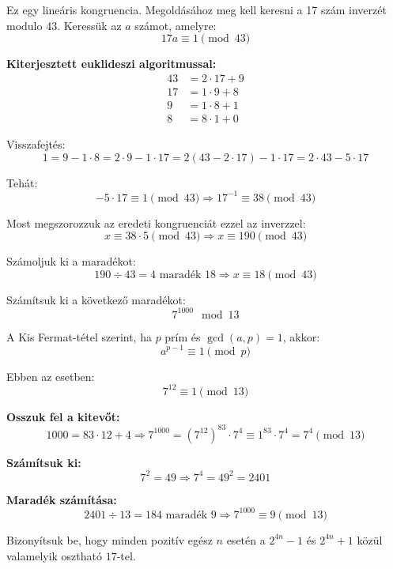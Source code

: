\begin{solution}
	Ez egy lineáris kongruencia. Megoldásához meg kell keresni a 17 szám
	inverzét modulo 43. Keressük az $a$ számot, amelyre: 
	\[
	17a\equiv1\pmod{43}
	\]
	
	\textbf{Kiterjesztett euklideszi algoritmussal:} 
	\begin{align*}
		43 & =2\cdot17+9\\
		17 & =1\cdot9+8\\
		9 & =1\cdot8+1\\
		8 & =8\cdot1+0
	\end{align*}
	
	Visszafejtés: 
	\[
	1=9-1\cdot8=2\cdot9-1\cdot17=2(43-2\cdot17)-1\cdot17=2\cdot43-5\cdot17
	\]
	
	Tehát: 
	\[
	-5\cdot17\equiv1\pmod{43}\Rightarrow17^{-1}\equiv38\pmod{43}
	\]
	
	Most megszorozzuk az eredeti kongruenciát ezzel az inverzzel: 
	\[
	x\equiv38\cdot5\pmod{43}\Rightarrow x\equiv190\pmod{43}
	\]
	
	Számoljuk ki a maradékot: 
	\[
	190\div43=4\text{ maradék }18\Rightarrow\boxed{x\equiv18\pmod{43}}
	\]
\end{solution}

\begin{extraproblem}
	Számítsuk ki a következő maradékot: 
	\[
	7^{1000}\mod 13
	\]
\end{extraproblem}

\begin{solution}
	A Kis Fermat-tétel szerint, ha $p$ prím és $\gcd(a,p)=1$, akkor:
	\[
	a^{p-1}\equiv1\pmod p
	\]
	
	Ebben az esetben: 
	\[
	7^{12}\equiv1\pmod{13}
	\]
	
	\textbf{Osszuk fel a kitevőt:} 
	\[
	1000=83\cdot12+4\Rightarrow7^{1000}=(7^{12})^{83}\cdot7^{4}\equiv1^{83}\cdot7^{4}=7^{4}\pmod{13}
	\]
	
	\textbf{Számítsuk ki:} 
	\[
	7^{2}=49\Rightarrow7^{4}=49^{2}=2401
	\]
	
	\textbf{Maradék számítása:} 
	\[
	2401\div13=184\text{ maradék }9\Rightarrow\boxed{7^{1000}\equiv9\pmod{13}}
	\]
\end{solution}
\begin{extraproblem}
	Bizonyítsuk be, hogy minden pozitív egész $n$ esetén a $2^{4n}-1$
	és $2^{4n}+1$ közül valamelyik osztható $17$-tel. 
\end{extraproblem}

\vspace{0.5cm}


